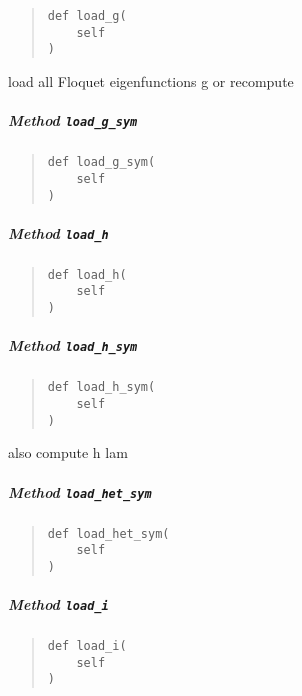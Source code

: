\documentclass[english,a4paper,oneside]{article}
\let\oldsubparagraph\subparagraph
\renewcommand{\subparagraph}[1]{\oldsubparagraph{#1}\mbox{}}
\begin{document}
\begin{quote}
\begin{verbatim}
def load_g(
    self
)
\end{verbatim}
\end{quote}

load all Floquet eigenfunctions g or recompute

\subparagraph{\texorpdfstring{Method
\texttt{load\_g\_sym}}{Method load\_g\_sym}}\label{StrongCoupling.StrongCoupling.load_g_sym}

\begin{quote}
\begin{verbatim}
def load_g_sym(
    self
)
\end{verbatim}
\end{quote}

\subparagraph{\texorpdfstring{Method
\texttt{load\_h}}{Method load\_h}}\label{StrongCoupling.StrongCoupling.load_h}

\begin{quote}
\begin{verbatim}
def load_h(
    self
)
\end{verbatim}
\end{quote}

\subparagraph{\texorpdfstring{Method
\texttt{load\_h\_sym}}{Method load\_h\_sym}}\label{StrongCoupling.StrongCoupling.load_h_sym}

\begin{quote}
\begin{verbatim}
def load_h_sym(
    self
)
\end{verbatim}
\end{quote}

also compute h lam

\subparagraph{\texorpdfstring{Method
\texttt{load\_het\_sym}}{Method load\_het\_sym}}\label{StrongCoupling.StrongCoupling.load_het_sym}

\begin{quote}
\begin{verbatim}
def load_het_sym(
    self
)
\end{verbatim}
\end{quote}

\subparagraph{\texorpdfstring{Method
\texttt{load\_i}}{Method load\_i}}\label{StrongCoupling.StrongCoupling.load_i}

\begin{quote}
\begin{verbatim}
def load_i(
    self
)
\end{verbatim}
\end{quote}
\end{document}
